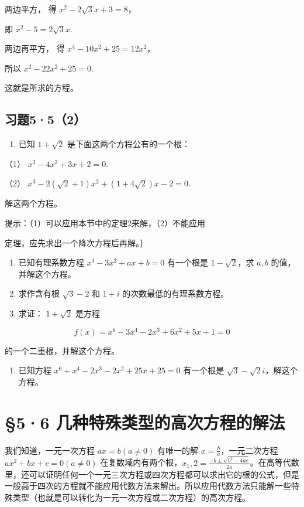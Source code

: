 两边平方， 得 \(x^{2}-2\sqrt{3}x+3=8\)，

即 \(x^{2} - 5 = 2\sqrt{3} x.\)

两边再平方， 得 \(x^{4}-10x^{2}+25=12x^{2}\)，

所以 \(x^{2} - 22x^{2} + 25 = 0.\)

这就是所求的方程。

\subsection{习题5·5（2）}

\begin{enumerate}
\item
  已知 \(1 + \sqrt{2}\) 是下面这两个方程公有的一个根：
\end{enumerate}

（1） \(x^{2} - 4x^{2} + 3x + 2 = 0.\)

（2） \(x^{3} - 2(\sqrt{2} + 1)x^{2} + (1 + 4\sqrt{2})x - 2 = 0.\)

解这两个方程。

提示：（1）可以应用本节中的定理2来解，（2）不能应用

定理，应先求出一个降次方程后再解。］

\begin{enumerate}[start=2]
\item
  已知有理系数方程 \(x^{3} - 3x^{2} + ax + b = 0\) 有一个根是
  \(1 - \sqrt{2}\)，求 \(a, b\) 的值，并解这个方程。
\item
  求作含有根 \(\sqrt{3} - 2\) 和 \(1 + i\) 的次数最低的有理系数方程。
\item
  求证： \(1 + \sqrt{2}\) 是方程
\end{enumerate}

\[
f (x) = x ^ {6} - 3 x ^ {4} - 2 x ^ {3} + 6 x ^ {2} + 5 x + 1 = 0
\]

的一个二重根，并解这个方程。

\begin{enumerate}[start=5]
\item
  已知方程 \(x^{6} + x^{4} - 2x^{3} - 2x^{2} + 25x + 25 = 0\) 有一个根是
  \(\sqrt{3} - \sqrt{2}i\)，解这个方程。
\end{enumerate}

\section{§5·6 几种特殊类型的高次方程的解法}

我们知道，一元一次方程 \(ax = b (a \neq 0)\) 有唯一的解
\(x = \frac{b}{a}\)，一元二次方程 \(ax^2 + bx + c = 0 (a \neq 0)\)
在复数域内有两个根，\(x_1, 2 = \frac{-b \pm \sqrt{b^2 - 4ac}}{2a}\)。在高等代数里，还可以证明任何一个一元三次方程或四次方程都可以求出它的根的公式，但是一般高于四次的方程就不能应用代数方法来解出。所以应用代数方法只能解一些特殊类型（也就是可以转化为一元一次方程或二次方程）的高次方程。

